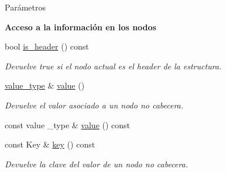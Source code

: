 \begin{DoxyParams}{\-Parámetros}
\begin{Indent}\textbf{ Acceso a la información en los nodos}\par
\begin{DoxyCompactItemize}
\item 
bool \hyperlink{structaed2_1_1iterator_1_1Node_ac65ed5331c97b4a00f435c169283f92f_ac65ed5331c97b4a00f435c169283f92f}{is\+\_\+header} () const
\begin{DoxyCompactList}\small\item\em Devuelve true si el nodo actual es el header de la estructura. \end{DoxyCompactList}\item 
\hyperlink{classaed2_1_1iterator_a6411a2c08b2b7c52f063bef1a168acb6_a6411a2c08b2b7c52f063bef1a168acb6}{value\+\_\+type} \& \hyperlink{structaed2_1_1iterator_1_1Node_a968601069822105337814f963d79d635_a968601069822105337814f963d79d635}{value} ()
\begin{DoxyCompactList}\small\item\em Devuelve el valor asociado a un nodo no cabecera. \end{DoxyCompactList}\item 
const value \+\_\+type \& \hyperlink{structaed2_1_1iterator_1_1Node_ad96bf1d32de8726678dd95c687f7ee36_ad96bf1d32de8726678dd95c687f7ee36}{value} () const
\item 
const Key \& \hyperlink{structaed2_1_1iterator_1_1Node_ac97fa35ede63ba3d4ba1988b5f16cc00_ac97fa35ede63ba3d4ba1988b5f16cc00}{key} () const
\begin{DoxyCompactList}\small\item\em Devuelve la clave del valor de un nodo no cabecera. \end{DoxyCompactList}\end{DoxyCompactItemize}
\end{Indent}

\end{DoxyParams}
